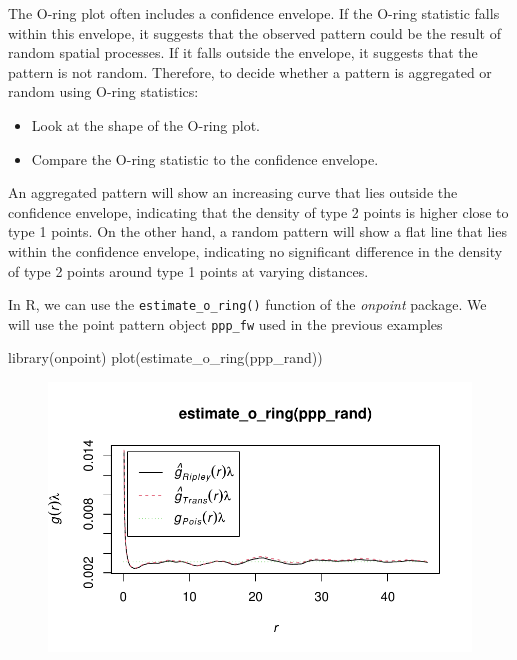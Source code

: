 \documentclass[
  letterpaper,
  DIV=11,
  numbers=noendperiod]{scrreprt}
\newenvironment{Shaded}{\begin{snugshade}}{\end{snugshade}}
\newcommand{\FunctionTok}[1]{\textcolor[rgb]{0.28,0.35,0.67}{#1}}
\newcommand{\NormalTok}[1]{\textcolor[rgb]{0.00,0.23,0.31}{#1}}
\begin{document}
The O-ring plot often includes a confidence envelope. If the O-ring
statistic falls within this envelope, it suggests that the observed
pattern could be the result of random spatial processes. If it falls
outside the envelope, it suggests that the pattern is not random.
Therefore, to decide whether a pattern is aggregated or random using
O-ring statistics:

\begin{itemize}
\item
  Look at the shape of the O-ring plot.
\item
  Compare the O-ring statistic to the confidence envelope.
\end{itemize}

An aggregated pattern will show an increasing curve that lies outside
the confidence envelope, indicating that the density of type 2 points is
higher close to type 1 points. On the other hand, a random pattern will
show a flat line that lies within the confidence envelope, indicating no
significant difference in the density of type 2 points around type 1
points at varying distances.

In R, we can use the \texttt{estimate\_o\_ring()} function of the
\emph{onpoint} package. We will use the point pattern object
\texttt{ppp\_fw} used in the previous examples

\begin{Shaded}
\begin{Highlighting}[]
\FunctionTok{library}\NormalTok{(onpoint)}
\FunctionTok{plot}\NormalTok{(}\FunctionTok{estimate\_o\_ring}\NormalTok{(ppp\_rand))}
\end{Highlighting}
\end{Shaded}

\begin{figure}[H]

{\centering \includegraphics{spatial-tests_files/figure-pdf/unnamed-chunk-40-1.pdf}

}

\end{figure}
\end{document}
